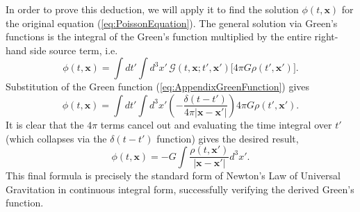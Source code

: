 In order to prove this deduction, we will apply it to find the solution $\phi(t, \textbf{x})$ for the original equation (\ref{eq:PoissonEquation}). The general solution via Green's functions is the integral of the Green's function multiplied by the entire right-hand side source term, i.e. 
\begin{equation}
    \phi(t, \textbf{x}) = \int dt' \int d^3x' \, \mathcal{G}(t, \textbf{x}; t', \textbf{x}') \Big[ 4\pi G \rho(t', \textbf{x}') \Big].
\end{equation}
Substitution of the Green function (\ref{eq:AppendixGreenFunction}) gives 
\begin{equation}
    \phi(t, \textbf{x}) = \int dt' \int d^3x' \left( -\frac{\delta(t - t')}{4\pi |\textbf{x} - \textbf{x}'|} \right) 4\pi G \rho(t', \textbf{x}').
\end{equation}
It is clear that the $4\pi$ terms cancel out and evaluating the time integral over $t'$ (which collapses via the $\delta(t-t')$ function) gives the desired result,
\begin{equation}
    \phi(t, \textbf{x}) = -G \int \frac{\rho(t, \textbf{x}')}{|\textbf{x} - \textbf{x}'|} d^3x'. \label{eq:AppendixPotential}
\end{equation}
This final formula is precisely the standard form of Newton's Law of Universal Gravitation in continuous integral form, successfully verifying the derived Green's function.
 